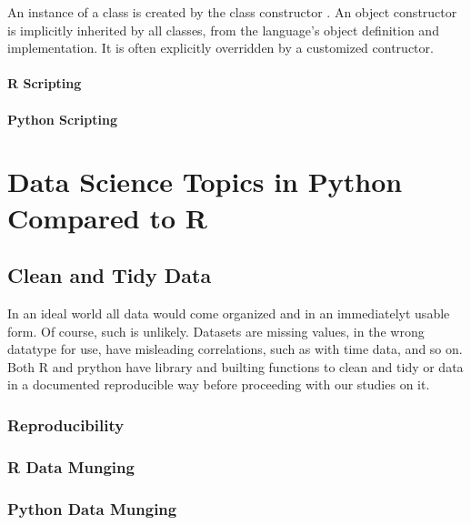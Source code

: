 \documentclass[]{book}
\theoremstyle{definition}
\theoremstyle{definition}
\theoremstyle{definition}
\theoremstyle{remark}
\begin{document}
An instance of a class is created by the class constructor
. An object constructor is implicitly inherited by
all classes, from the language's object definition and implementation.
It is often explicitly overridden by a customized contructor.

\subsection{R Scripting}\label{r-scripting-4}

\subsection{Python Scripting}\label{python-scripting-4}

\part{Data Science Topics in Python Compared to
R}\label{part-data-science-topics-in-python-compared-to-r}

\chapter{Clean and Tidy Data}\label{clean-and-tidy-data}

  In an ideal world all data would
come organized and in an immediatelyt usable form. Of course, such is
unlikely. Datasets are missing values, in the wrong datatype for use,
have misleading correlations, such as with time data, and so on. Both R
and prython have library and builting functions to clean and tidy or
data in a documented reproducible way before proceeding with our studies
on it.

\section{Reproducibility}\label{reproducibility}


\section{R Data Munging}\label{r-data-munging}


\section{Python Data Munging}\label{python-data-munging}
\end{document}
